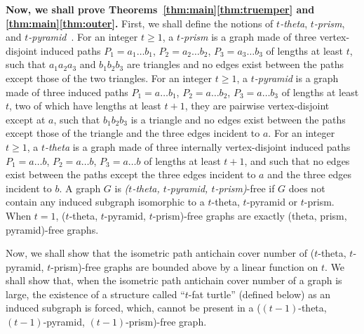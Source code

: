 \documentclass[a4paper]{article}
\newcommand{\dd}[1]{\textcolor{red}{#1}}
\begin{document}
\medskip\noindent
\textbf{Now, we shall prove Theorems~\ref{thm:main}\ref{thm:truemper} and \ref{thm:main}\ref{thm:outer}.} First, we shall define the notions of \emph{$t$-theta}, \emph{$t$-prism}, and \emph{$t$-pyramid}~\cite{trotignonprivate}. For an integer $t\geq 1$, a \emph{$t$-prism} is a graph made of three vertex-disjoint induced paths $P_1 = a_1\ldots b_1$, $P_2 = a_2\ldots b_2$, $P_3 = a_3\ldots b_3$ of lengths at least $t$, such that $a_1 a_2 a_3$ and $b_1 b_2b_3$ are triangles and no edges exist between the paths except those of the two triangles. For an integer $t\geq 1$, a \emph{$t$-pyramid} is a graph made of three induced paths $P_1 = a\ldots b_1$, $P_2 = a\ldots b_2$, $P_3 = a\ldots b_3$ of lengths at least $t$, two of which
 have lengths at least $t+1$, {they are pairwise} vertex-disjoint except at $a$, such that $b_1 b_2 b_3$ is a triangle and no edges exist between the paths except those of the triangle and the three edges incident to $a$. For an integer $t\geq 1$, a \emph{$t$-theta} is a graph made of three {internally} vertex-disjoint induced paths $P_1 = a\ldots b$, $P_2 = a\ldots b$, $P_3 = a\ldots b$ of lengths at least $t+1$, and such that no edges exist between the paths except the three edges incident to $a$ and the three edges incident to $b$. A graph $G$ is \emph{($t$-theta, $t$-pyramid, $t$-prism)}-free if $G$ does not contain any induced subgraph isomorphic to a $t$-theta, $t$-pyramid or $t$-prism. When $t=1$, ($t$-theta, $t$-pyramid, $t$-prism)-free graphs are exactly (theta, prism, pyramid)-free graphs. 
 

Now, we shall show that the isometric path antichain cover number of ($t$-theta, $t$-pyramid, $t$-prism)-free graphs are bounded above by a linear function on $t$. We shall show that, when the isometric path antichain cover number of a graph is large, the existence of a structure called ``$t$-fat turtle'' (defined below) as an induced subgraph is forced, which, cannot be present in a ($(t-1)$-theta, $(t-1)$-pyramid, $(t-1)$-prism)-free graph. 

\end{document}
